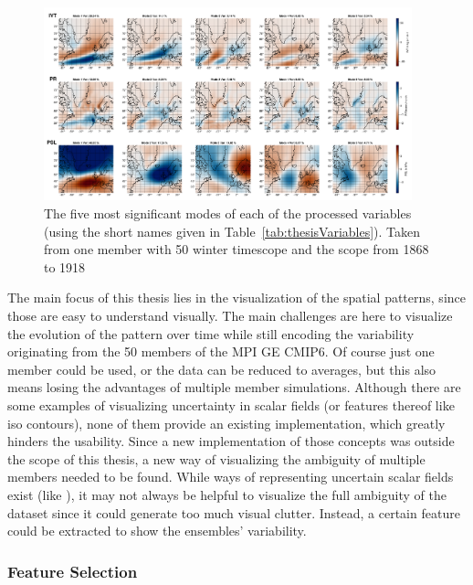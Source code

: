 \begin{figure}[htb]
  \begin{center}
    \includegraphics[width=0.95\textwidth]{figures/top5_spatial_modes_ivt_psl_pr_mem11_scope20.png}
\end{center}
  \caption{The five most significant modes of each of the processed variables (using the short names given in Table~\ref{tab:thesisVariables}). Taken from one member with 50 winter timescope and the scope from 1868 to 1918}
  \label{fig:5modes each variable}
\end{figure}


The main focus of this thesis lies in the visualization of the spatial patterns, since those are easy to understand visually.  
The main challenges are here to visualize the evolution of the pattern over time while still encoding the variability originating from the 50 members of the MPI GE CMIP6. 
Of course just one member could be used, or the data can be reduced to averages, but this also means losing the advantages of multiple member simulations. 
Although there are some examples of visualizing uncertainty in scalar fields (or features thereof like iso contours), none of them provide an existing implementation, which greatly hinders the usability. 
Since a new implementation of those concepts was outside the scope of this thesis, a new way of visualizing the ambiguity of multiple members needed to be found. 
While ways of representing uncertain scalar fields exist (like \cite{coninx_visualization_2011}), it may not always be helpful to visualize the full ambiguity of the dataset since it could generate too much visual clutter. 
Instead, a certain feature could be extracted to show the ensembles' variability.



\subsubsection{Feature Selection}

